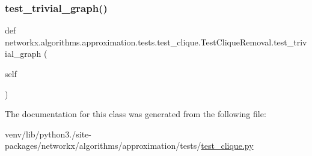 \subsubsection{\texorpdfstring{test\+\_\+trivial\+\_\+graph()}{test\_trivial\_graph()}}
{\footnotesize\ttfamily def networkx.\+algorithms.\+approximation.\+tests.\+test\+\_\+clique.\+Test\+Clique\+Removal.\+test\+\_\+trivial\+\_\+graph (\begin{DoxyParamCaption}\item[{}]{self }\end{DoxyParamCaption})}



The documentation for this class was generated from the following file\+:\begin{DoxyCompactItemize}
\item 
venv/lib/python3./site-\/packages/networkx/algorithms/approximation/tests/\hyperlink{approximation_2tests_2test__clique_8py}{test\+\_\+clique.\+py}\end{DoxyCompactItemize}
